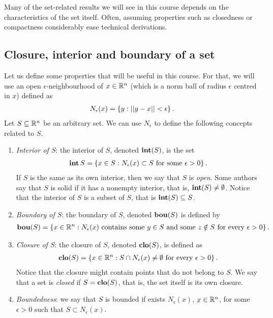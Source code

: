 Many of the set-related results we will see in this course depends on the characteristics of the set itself. Often, assuming properties such as closedness or compactness considerably ease technical derivations. 


\subsection{Closure, interior and boundary of a set}


Let us define some properties that will be useful in this course. For that, we will use an open $\epsilon$-neighbourhood of $x \in \mathbb{R}^n$ (which is a norm ball of radius $\epsilon$ centred in $x$) defined as
%
\begin{align*}
    N_\epsilon(x) = \left\{ y : ||y - x|| < \epsilon \right \}.
\end{align*}
%
Let $S \subseteq \mathbb{R}^n$ be an arbitrary set. We can use $N_\epsilon$ to define the following concepts related to $S$.  
\begin{enumerate}
	\item \emph{Interior of $S$}: the interior of $S$, denoted $\mathop{\bf int}(S)$, is the set
	\begin{align*}
	\mathop{\bf int}{S} = \left\{ x \in S : N_\epsilon(x) \subset S \text{ for some } \epsilon > 0 \right \}.
	\end{align*}
	If $S$ is the same as its own interior, then we say that $S$ is \emph{open}. Some authors say that $S$ is solid if it has a nonempty interior, that is, $\mathop{\bf int}(S) \neq \emptyset$. Notice that the interior of $S$ is a subset of $S$, that is $\mathop{\bf int}(S) \subseteq S$.
	\item \emph{Boundary of $S$}: the boundary of $S$, denoted $\mathop{\bf bou}(S)$ is defined by
	\begin{align*}
	\mathop{\bf bou}(S) = \left\{ x \in \mathbb{R}^n : N_\epsilon(x) \text{ contains some } y \in S \text{ and some } z \notin S \text{ for every } \epsilon > 0 \right \}.
	\end{align*}
	\item \emph{Closure of $S$}: the closure of $S$, denoted $\mathop{\bf clo}(S)$, is defined as 
	\begin{align*}
	\mathop{\bf clo}(S) = \left\{ x \in \mathbb{R}^n : S \cap N_\epsilon(x) \neq \emptyset \text{ for every } \epsilon > 0 \right \}. 
	\end{align*}
	Notice that the closure might contain points that do not belong to $S$. We say that a set is \emph{closed} if $S = \mathop{\bf clo}(S)$, that is, the set itself is its own closure. 
	\item \emph{Boundedness}: we say that $S$ is bounded if exists $N_\epsilon(x)$, $x \in \mathbb{R}^n$, for some $\epsilon > 0$ such that $S \subset N_\epsilon(x)$. 
\end{enumerate}


